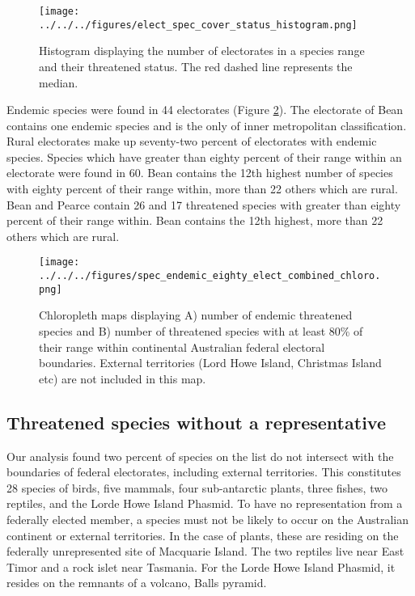 \documentclass[a4paper,11pt]{article}
\begin{document}
\begin{figure}[H]
	\centering
    \texttt{[image: ../../../figures/elect\_spec\_cover\_status\_histogram.png]}
    \caption{Histogram displaying the number of electorates in a species range and their threatened status. The red dashed line represents the median.}
    \label{fig:hist}
\end{figure}


Endemic species were found in 44 electorates (Figure \ref{fig:combined_chloro}). The electorate of Bean contains one endemic species and is the only of inner metropolitan classification. Rural electorates make up seventy-two percent of electorates with endemic species. Species which have greater than eighty percent of their range within an electorate were found in 60. Bean contains the 12th highest number of species with eighty percent of their range within, more than 22 others which are rural. Bean and Pearce contain 26 and 17 threatened species with greater than eighty percent of their range within. Bean contains the 12th highest, more than 22 others which are rural.

\begin{figure}[H]
	\centering
    \texttt{[image: ../../../figures/spec\_endemic\_eighty\_elect\_combined\_chloro.png]}
    \caption{Chloropleth maps displaying A) number of endemic threatened species and B) number of threatened species with at least 80\% of their range within continental Australian federal electoral boundaries. External territories (Lord Howe Island, Christmas Island etc) are not included in this map.}
    \label{fig:combined_chloro}
\end{figure}


\subsection{Threatened species without a representative}
Our analysis found two percent of species on the list do not intersect with the boundaries of federal electorates, including external territories. This constitutes 28 species of birds, five mammals, four sub-antarctic plants, three fishes, two reptiles, and the Lorde Howe Island Phasmid. To have no representation from a federally elected member, a species must not be likely to occur on the Australian continent or external territories. In the case of plants, these are residing on the federally unrepresented site of Macquarie Island. The two reptiles live near East Timor and a rock islet near Tasmania. For the Lorde Howe Island Phasmid, it resides on the remnants of a volcano, Balls pyramid. 
\end{document}
